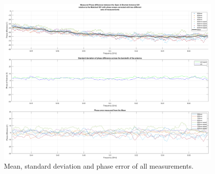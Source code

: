     \begin{figure}[H]
    \centering
    \includegraphics[width=0.99\linewidth]{Figures/chp4_Calibrated_difference_results_rept.png}
    \caption{Mean, standard deviation and phase error of all measurements.}
    \label{fig:chp4_Calibrated_difference_results_rept}
    \end{figure}

\ifstandalone

\printnoidxglossary[type=\acronymtype,nonumberlist]
\fi
%
